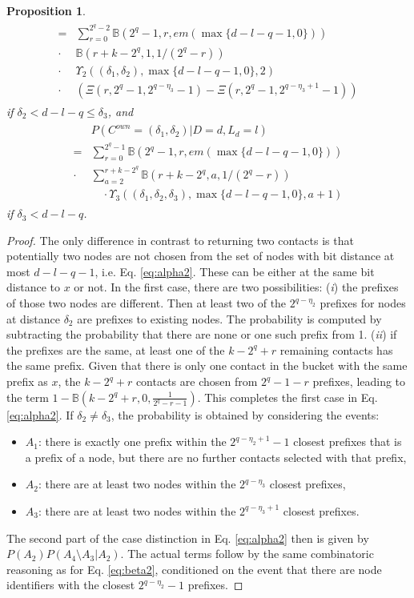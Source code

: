 \documentclass[10pt, conference, compsocconf, letterpaper]{IEEEtran}
\renewcommand{\binom}{\mathbb{B}}
\renewcommand{\over}{\Xi}
\newcommand{\best}{\Upsilon}
\newtheorem{proposition}{Proposition}
\begin{document}
\begin{proposition}
\begin{align}
\begin{split}
=&\sum_{r=0}^{2^q-2}\binom(2^q-1,r,em(\max\{d-l-q-1,0\}))\\
\cdot & \binom(r+k-2^q,1,1/(2^q-r))\\
\cdot &\best_2((\delta_1,\delta_2),\max\{d-l-q-1,0\},2) \\
\cdot &\left(\over(r,2^{q}-1,2^{q-\eta_3}-1)-\over(r,2^{q}-1,2^{q-\eta_3+1}-1)\right)
\end{split} 
\end{align}
if $\delta_2 < d-l-q\leq \delta_3$, and
\begin{align}
\label{eq:alpha4}
\begin{split}
&P\left(C^{own}=(\delta_1, \delta_2)|D=d,L_d=l\right) \\
=&\sum_{r=0}^{2^q-1}\binom(2^q-1,r,em(\max\{d-l-q-1,0\}))\\
\cdot &\sum_{a=2}^{r+k-2^q} \binom(r+k-2^q,a,1/(2^q-r))\\
&\quad \cdot \best_3((\delta_1,\delta_2,\delta_3),\max\{d-l-q-1,0\},a+1)
\end{split} 
\end{align}
if $\delta_3 < d-l-q$.
\end{proposition}
 \begin{proof}
 The only difference in contrast to returning two contacts is that potentially two nodes
 are not chosen from the set of nodes with bit distance at most $d-l-q-1$, i.e.
 Eq. \ref{eq:alpha2}.
 These can be either at the same bit distance to $x$ or not.
 In the first case, there are two possibilities: (\emph{i}) the prefixes of
 those two nodes are different. Then  at least two of the
 $2^{q-\eta_2}$ prefixes for nodes at distance $\delta_2$ are 
 prefixes to existing nodes. 
 The probability is computed by subtracting the probability that there
 are none or one such prefix from 1. (\emph{ii}) if the prefixes are the same, at least one of the $k-2^q+r$ remaining contacts 
  has the same prefix. Given that there is only one contact in the bucket with the
  same prefix as $x$, the $k-2^q+r$ contacts are chosen from $2^q-1-r$ prefixes,
  leading to the term $1-\binom(k-2^q+r,0,\frac{1}{2^q-r-1})$.
  This completes the first case in Eq. \ref{eq:alpha2}. If $\delta_2\neq \delta_3$, the probability is obtained by considering
  the events:
  \begin{itemize}
  \item $A_1$: there is exactly one prefix within the $2^{q-\eta_2+1}-1$ closest prefixes
  that is a prefix of a node, but there are no further contacts selected with that prefix,
  \item $A_2$: there are at least two nodes within the $2^{q-\eta_3}$ closest prefixes,
  \item $A_3$: there are at least two nodes within the $2^{q-\eta_3+1}$ closest prefixes.
  \end{itemize}
  The second part of the case distinction in Eq. \ref{eq:alpha2} then is given by
  $P(A_2)P(A_4\setminus A_3|A_2)$. The actual terms follow by the same combinatoric reasoning as for Eq. \ref{eq:beta2}, conditioned   on the event that there are node identifiers with the closest $2^{q-\eta_2}-1$ prefixes. \end{proof}
  
\end{document}
